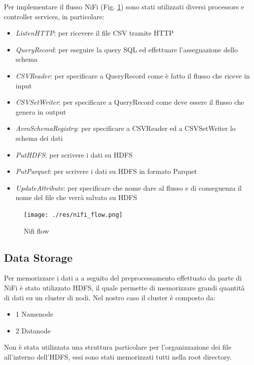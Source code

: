 \documentclass[conference]{IEEEtran}
\begin{document}
Per implementare il flusso NiFi (Fig. \ref{fig:nifi_flow}) sono stati utilizzati diversi processors e controller services, in particolare:
\begin{itemize}
    \item \textit{ListenHTTP}: per ricevere il file CSV tramite HTTP
    \item \textit{QueryRecord}: per eseguire la query SQL ed effettuare l'assegnazione dello schema
    \item \textit{CSVReader}: per specificare a QueryRecord come è fatto il flusso che riceve in input
    \item \textit{CSVSetWriter}: per specificare a QueryRecord come deve essere il flusso che genera in output
    \item \textit{AvroSchemaRegistry}: per specificare a CSVReader ed a CSVSetWriter lo schema dei dati
    \item \textit{PutHDFS}: per scrivere i dati su HDFS
    \item \textit{PutParquet}: per scrivere i dati su HDFS in formato Parquet
    \item \textit{UpdateAttribute}: per specificare che nome dare al flusso e di conseguenza il nome del file che verrà salvato su HDFS
\end{itemize}
\begin{figure}[H]
    \centering
    \texttt{[image: ./res/nifi\_flow.png]}
    \caption{Nifi flow}
    \label{fig:nifi_flow}
\end{figure} 
\subsection{Data Storage}
Per memorizzare i dati a a seguito del preprocessamento effettuato da parte di NiFi è stato utilizzato HDFS, il quale permette di memorizzare grandi quantità di dati su un cluster di nodi. Nel nostro caso il cluster è composto da:
\begin{itemize}
    \item 1 Namenode
    \item 2 Datanode
\end{itemize}
Non è stata utilizzata una struttura particolare per l'organizzazione dei file all'interno dell'HDFS, essi sono stati memorizzati tutti nella root directory.
\end{document}
